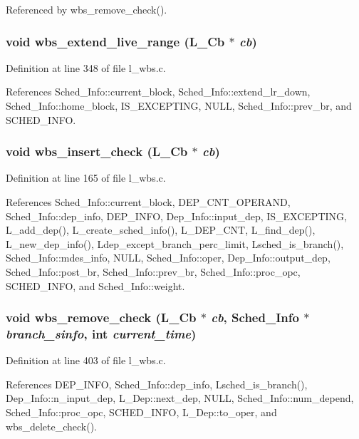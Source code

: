 Referenced by wbs\_\-remove\_\-check().
\subsubsection{\setlength{\rightskip}{0pt plus 5cm}void wbs\_\-extend\_\-live\_\-range (L\_\-Cb $\ast$ {\em cb})}\label{l__wbs_8c_a97fcb27b1169928383561c2d0c7e9cb}




Definition at line 348 of file l\_\-wbs.c.

References Sched\_\-Info::current\_\-block, Sched\_\-Info::extend\_\-lr\_\-down, Sched\_\-Info::home\_\-block, IS\_\-EXCEPTING, NULL, Sched\_\-Info::prev\_\-br, and SCHED\_\-INFO.
\subsubsection{\setlength{\rightskip}{0pt plus 5cm}void wbs\_\-insert\_\-check (L\_\-Cb 		$\ast$ {\em cb})}\label{l__wbs_8c_76591b5f94a673030c28abbcc9a2b299}




Definition at line 165 of file l\_\-wbs.c.

References Sched\_\-Info::current\_\-block, DEP\_\-CNT\_\-OPERAND, Sched\_\-Info::dep\_\-info, DEP\_\-INFO, Dep\_\-Info::input\_\-dep, IS\_\-EXCEPTING, L\_\-add\_\-dep(), L\_\-create\_\-sched\_\-info(), L\_\-DEP\_\-CNT, L\_\-find\_\-dep(), L\_\-new\_\-dep\_\-info(), Ldep\_\-except\_\-branch\_\-perc\_\-limit, Lsched\_\-is\_\-branch(), Sched\_\-Info::mdes\_\-info, NULL, Sched\_\-Info::oper, Dep\_\-Info::output\_\-dep, Sched\_\-Info::post\_\-br, Sched\_\-Info::prev\_\-br, Sched\_\-Info::proc\_\-opc, SCHED\_\-INFO, and Sched\_\-Info::weight.
\subsubsection{\setlength{\rightskip}{0pt plus 5cm}void wbs\_\-remove\_\-check (L\_\-Cb 	$\ast$ {\em cb}, \bf{Sched\_\-Info}	$\ast$ {\em branch\_\-sinfo}, int {\em current\_\-time})}\label{l__wbs_8c_f84d1a493e2338334028178dadda7c7f}




Definition at line 403 of file l\_\-wbs.c.

References DEP\_\-INFO, Sched\_\-Info::dep\_\-info, Lsched\_\-is\_\-branch(), Dep\_\-Info::n\_\-input\_\-dep, L\_\-Dep::next\_\-dep, NULL, Sched\_\-Info::num\_\-depend, Sched\_\-Info::proc\_\-opc, SCHED\_\-INFO, L\_\-Dep::to\_\-oper, and wbs\_\-delete\_\-check().